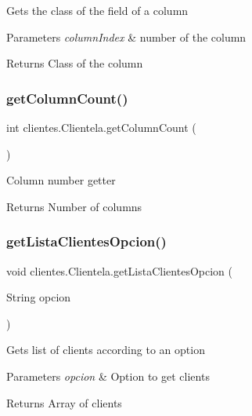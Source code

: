 Gets the class of the field of a column 
\begin{DoxyParams}{Parameters}
{\em column\+Index} & number of the column \\
\hline
\end{DoxyParams}
\begin{DoxyReturn}{Returns}
Class of the column 
\end{DoxyReturn}
\mbox{\label{classclientes_1_1_clientela_a43ca9c21c992f1bd25544b5cc6d1ed0e}} 
\subsubsection{\texorpdfstring{get\+Column\+Count()}{getColumnCount()}}
{\footnotesize\ttfamily int clientes.\+Clientela.\+get\+Column\+Count (\begin{DoxyParamCaption}{ }\end{DoxyParamCaption})\hspace{0.3cm}{\ttfamily [inline]}}

Column number getter \begin{DoxyReturn}{Returns}
Number of columns 
\end{DoxyReturn}
\mbox{\label{classclientes_1_1_clientela_a8275e9ef86c96a9070cff779e5a0169e}} 
\subsubsection{\texorpdfstring{get\+Lista\+Clientes\+Opcion()}{getListaClientesOpcion()}}
{\footnotesize\ttfamily void clientes.\+Clientela.\+get\+Lista\+Clientes\+Opcion (\begin{DoxyParamCaption}\item[{String}]{opcion }\end{DoxyParamCaption})\hspace{0.3cm}{\ttfamily [inline]}}

Gets list of clients according to an option 
\begin{DoxyParams}{Parameters}
{\em opcion} & Option to get clients \\
\hline
\end{DoxyParams}
\begin{DoxyReturn}{Returns}
Array of clients 
\end{DoxyReturn}
\mbox{\label{classclientes_1_1_clientela_a036492cd5e2bba079ef0874b9693d9e1}} 
